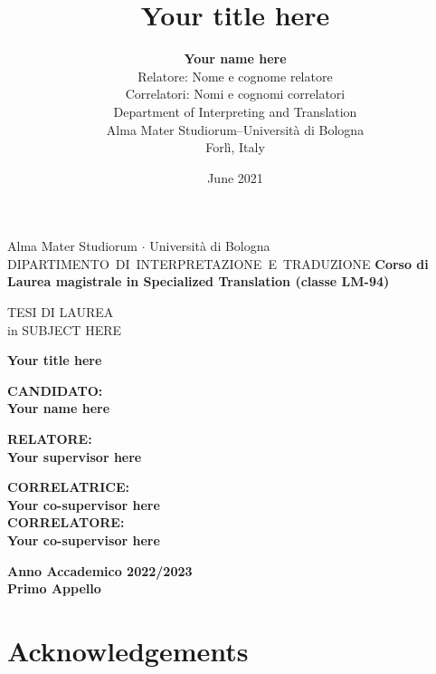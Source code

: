 \documentclass[12pt]{book}
\title{Your title here}
\author{\textbf{Your name here}\\
Relatore: Nome e cognome relatore \\
Correlatori: Nomi e cognomi correlatori\\
Department of Interpreting and Translation\\
Alma Mater Studiorum--Universit\`a di Bologna\\
Forl\`i, Italy
}
\date{June 2021}
\renewcommand{\&}{\textup{\symbol{`\&}}}
\begin{document}
\begin{center}
{{\Large{Alma Mater Studiorum $\cdot$ Universit\`a di
Bologna\\}}}
\vspace{5mm}
\mbox{\large{DIPARTIMENTO DI INTERPRETAZIONE E TRADUZIONE}}
\vspace{5mm}
{\small{\bf Corso di Laurea magistrale in Specialized Translation (classe 
LM-94) }}
\end{center}
\vspace{15mm}
\begin{center}
{TESI DI LAUREA\\in SUBJECT HERE}
\end{center}

\vspace{15mm}
\begin{center}
\LARGE{\bf Your title here}
\end{center}
\vspace{25mm}
\par
\noindent
\begin{minipage}[t]{0.47\textwidth}
{\large{\bf CANDIDATO:\\Your name here}}
\end{minipage}
\hfill
\begin{minipage}[t]{0.47\textwidth}\raggedleft
{\large{\bf RELATORE:\\Your supervisor here}}  
\end{minipage}

\hfill
\begin{minipage}[t]{0.47\textwidth}\raggedleft
{\large{\bf CORRELATRICE:\\ Your co-supervisor here\\CORRELATORE:\\Your co-supervisor here}}
\end{minipage}

\vspace{20mm}
\begin{center}
{\bf Anno Accademico 2022/2023\\
Primo Appello}
\end{center}
\thispagestyle{empty}
\renewcommand{\thepage}{\roman{page}}%
\chapter*{Acknowledgements}
\end{document}
